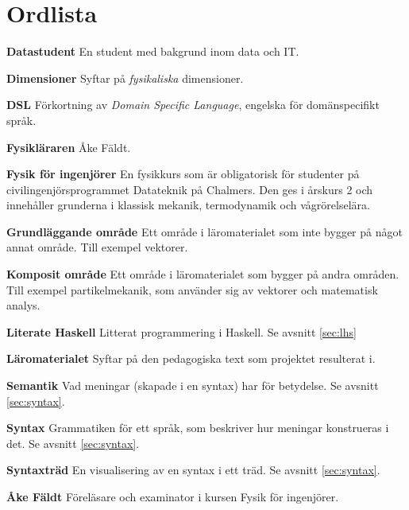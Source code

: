 
\chapter*{Ordlista}

\textbf{Datastudent} En student med bakgrund inom data och IT.

\textbf{Dimensioner} Syftar på \textit{fysikaliska} dimensioner.

\textbf{DSL} Förkortning av \textit{Domain Specific Language}, engelska för domänspecifikt språk.

\textbf{Fysikläraren} Åke Fäldt.

\textbf{Fysik för ingenjörer} En fysikkurs som är obligatorisk för studenter på civilingenjörsprogrammet Datateknik på Chalmers. Den ges i årskurs 2 och innehåller grunderna i klassisk mekanik, termodynamik och vågrörelselära.

\textbf{Grundläggande område} Ett område i läromaterialet som inte bygger på något annat område. Till exempel vektorer.

\textbf{Komposit område} Ett område i läromaterialet som bygger på andra områden. Till exempel partikelmekanik, som använder sig av vektorer och matematisk analys.

\textbf{Literate Haskell} Litterat programmering i Haskell. Se avsnitt \ref{sec:lhs}

\textbf{Läromaterialet} Syftar på den pedagogiska text som projektet resulterat i.

\textbf{Semantik} Vad meningar (skapade i en syntax) har för betydelse. Se avsnitt \ref{sec:syntax}.

\textbf{Syntax} Grammatiken för ett språk, som beskriver hur meningar konstrueras i det. Se avsnitt \ref{sec:syntax}.

\textbf{Syntaxträd} En visualisering av en syntax i ett träd. Se avsnitt \ref{sec:syntax}.

\textbf{Åke Fäldt} Föreläsare och examinator i kursen Fysik för ingenjörer.
